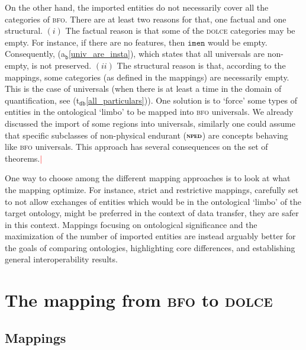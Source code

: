 \documentclass[ao]{iosart2x}
\newcommand{\nb}[1]{\textcolor{red}{$|$}\marginpar{\hspace*{-0cm}\parbox{20mm}{\scriptsize\raggedright\textcolor{red}{#1}}}}
\newcommand{\bfoAxLabel}{\textrm{a$_\texttt{b}$}}
\newcommand{\dbThrLabel}{\textrm{t$_\texttt{db}$}}
\newcommand{\refbfoax}[1]{({\bfoAxLabel}\ref{#1})}
\newcommand{\refdbth}[1]{({\dbThrLabel}\ref{#1})}
\newcommand{\cn}[1]{\mathtt{#1}}
\newcommand{\dolce}{{\textsc{dolce}}}
\newcommand{\bfo}{{\textsc{bfo}}}
\newcommand {\NPEDdcat} {\textsc{nped}}
\newcommand{\imenbcat}{\cn{imen}}
\begin{document}
On the other hand, the imported entities do not necessarily cover all the categories of {\bfo}. There are at least two reasons for that, one factual and one structural. $(i)$ The factual reason is that some of the {\dolce} categories may be empty. For instance, if there are no features, then $\imenbcat$ would be empty. Consequently, \refbfoax{univ_are_insta}, which states that all universals are non-empty, is not preserved. $(ii)$ The structural reason is that, according to the mappings, some categories (as defined in the mappings) are necessarily empty. %
  This is the case of universals (when there is at least a time in the domain of quantification, see \refdbth{all_particulars}). One solution is to `force' some types of entities in the ontological `limbo' to be mapped into {\bfo} universals. We already discussed the import of some regions into universals, similarly one could assume that specific subclasses of non-physical endurant ($\NPEDdcat$) are concepts behaving like {\bfo} universals. This approach has several consequences on the set of theorems.\nb{CM: ci sarebbero un sacco di altre osservazioni da fare sui teoremi che non seguono%
\\
SB: lascierei così almeno per ora}


One way to choose among the different mapping approaches is to look at what the mapping optimize. For instance, strict and restrictive mappings, carefully set to not allow exchanges of entities which would be in the ontological `limbo' of the target ontology, might be preferred in the context of data transfer, they are safer in this context. Mappings focusing on ontological significance and the maximization of the number of imported entities are instead arguably better for the goals of comparing ontologies, highlighting core differences, and establishing general interoperability results.

\section{The mapping from {\bfo} to {\dolce}}\label{sect_b2d}

\subsection{Mappings}\label{sect_mappings_b2d}
\end{document}
